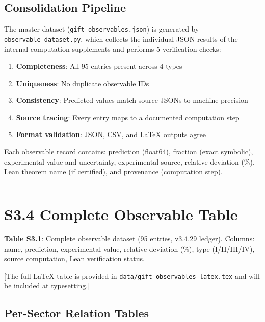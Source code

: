 \documentclass[11pt,a4paper]{article}
\begin{document}
\subsection{Consolidation Pipeline}\label{consolidation-pipeline}

The master dataset (\texttt{gift\_\allowbreak{}observables.\allowbreak{}json}) is generated by \texttt{observable\_\allowbreak{}dataset.\allowbreak{}py}, which collects the individual JSON results of the internal computation supplements and performs 5 verification checks:

\begin{enumerate}
\def\labelenumi{\arabic{enumi}.}
\tightlist
\item
  \textbf{Completeness}: All 95 entries present across 4 types
\item
  \textbf{Uniqueness}: No duplicate observable IDs
\item
  \textbf{Consistency}: Predicted values match source JSONs to machine precision
\item
  \textbf{Source tracing}: Every entry maps to a documented computation step
\item
  \textbf{Format validation}: JSON, CSV, and LaTeX outputs agree
\end{enumerate}

Each observable record contains: prediction (float64), fraction (exact symbolic), experimental value and uncertainty, experimental source, relative deviation (\%), Lean theorem name (if certified), and provenance (computation step).

\begin{center}\rule{\linewidth}{0.5pt}\end{center}

\section{S3.4 Complete Observable Table}\label{s3.4-complete-observable-table}

\textbf{Table S3.1}: Complete observable dataset (95 entries, v3.4.29 ledger). Columns: name, prediction, experimental value, relative deviation (\%), type (I/II/III/IV), source computation, Lean verification status.

{[}The full LaTeX table is provided in \texttt{data/\allowbreak{}gift\_\allowbreak{}observables\_\allowbreak{}latex.\allowbreak{}tex} and will be included at typesetting.{]}

\subsection{Per-Sector Relation Tables}\label{per-sector-relation-tables}
\end{document}
